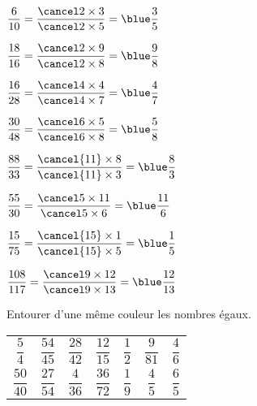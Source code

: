 \begin{Maquette}[Fiche,CorrigeFin,Colonnes=2]{}
\begin{multicols}{2}
      \begin{Solution}
         \begin{colenumerate}
            \item $\dfrac{6}{10} =\dfrac{\cancel2\times3}{\cancel2\times5} =\blue\dfrac35$ \smallskip
            \item $\dfrac{18}{16} =\dfrac{\cancel2\times9}{\cancel2\times8} =\blue\dfrac98$ \smallskip
            \item $\dfrac{16}{28} =\dfrac{\cancel4\times4}{\cancel4\times7} =\blue\dfrac47$ \smallskip
            \item $\dfrac{30}{48} =\dfrac{\cancel6\times5}{\cancel6\times8} =\blue\dfrac58$ \smallskip
            \item $\dfrac{88}{33} =\dfrac{\cancel{11}\times8}{\cancel{11}\times3} =\blue\dfrac83$ \smallskip
            \item $\dfrac{55}{30} =\dfrac{\cancel5\times11}{\cancel5\times6} =\blue\dfrac{11}6$ \smallskip
            \item $\dfrac{15}{75} =\dfrac{\cancel{15}\times1}{\cancel{15}\times5} =\blue\dfrac15$ \smallskip
            \item $\dfrac{108}{117} =\dfrac{\cancel9\times12}{\cancel9\times13} =\blue\dfrac{12}{13}$ \smallskip
         \end{colenumerate}
      \end{Solution}
           
         
      \begin{exercice}[Tout] %
         Entourer d'une même couleur les nombres égaux. \par
         {
         \begin{tabular}{*{7}{C{0.74}}}
            $\dfrac{5}{4}$ & $\dfrac{54}{45}$ & $\dfrac{28}{42}$ & $\dfrac{12}{15}$ & $\dfrac{1}{2}$ & $\dfrac{9}{81}$ & $\dfrac{4}{6}$ \\ [2mm]
            $\dfrac{50}{40}$ & $\dfrac{27}{54}$ & $\dfrac{4}{36}$ & $\dfrac{36}{72}$ & $\dfrac{1}{9}$ & $\dfrac{4}{5}$ & $\dfrac{6}{5}$ \\
         \end{tabular}}
      \end{exercice}
      

\end{multicols}
\end{Maquette}
